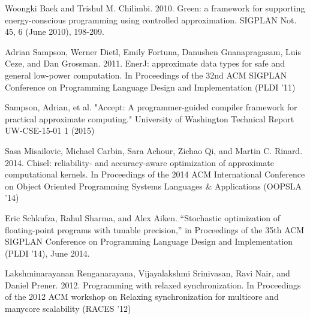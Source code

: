 \documentclass[12pt,conference]{IEEEtran}
\begin{document}
\begin{thebibliography}{11}
Woongki Baek and Trishul M. Chilimbi. 2010. Green: a framework for supporting energy-conscious programming using controlled approximation. SIGPLAN Not. 45, 6 (June 2010), 198-209. 

Adrian Sampson, Werner Dietl, Emily Fortuna, Danushen Gnanapragasam, Luis Ceze, and Dan Grossman. 2011. EnerJ: approximate data types for safe and general low-power computation. In Proceedings of the 32nd ACM SIGPLAN Conference on Programming Language Design and Implementation (PLDI '11)

Sampson, Adrian, et al. "Accept: A programmer-guided compiler framework for practical approximate computing." University of Washington Technical Report UW-CSE-15-01 1 (2015)

Sasa Misailovic, Michael Carbin, Sara Achour, Zichao Qi, and Martin C. Rinard. 2014. Chisel: reliability- and accuracy-aware optimization of approximate computational kernels. In Proceedings of the 2014 ACM International Conference on Object Oriented Programming Systems Languages \& Applications (OOPSLA '14) 

Eric Schkufza, Rahul Sharma, and Alex Aiken. “Stochastic optimization of floating-point
programs with tunable precision,” in Proceedings of the 35th ACM SIGPLAN Conference on
Programming Language Design and Implementation (PLDI ’14), June 2014.

Lakshminarayanan Renganarayana, Vijayalakshmi Srinivasan, Ravi Nair, and Daniel Prener. 2012. Programming with relaxed synchronization. In Proceedings of the 2012 ACM workshop on Relaxing synchronization for multicore and manycore scalability (RACES '12)

\end{thebibliography}
\end{document}
